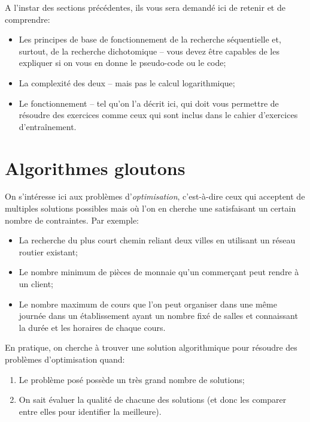 \documentclass[12pt]{article}
\begin{document}
	\begin{MonRet}
		A l'instar des sections précédentes, ils vous sera demandé ici de retenir et de comprendre:
		\begin{itemize}
			\item Les principes de base de fonctionnement de la recherche séquentielle et, surtout, de la recherche dichotomique -- vous devez être capables de les expliquer si on vous en donne le pseudo-code ou le code;
			\item La complexité des deux -- mais pas le calcul logarithmique;
			\item Le fonctionnement -- tel qu'on l'a décrit ici, qui doit vous permettre de résoudre des exercices comme ceux qui sont inclus dans le cahier d'exercices d'entraînement.
		\end{itemize}
		
		
	\end{MonRet}
	\pagebreak
	
	\section{Algorithmes gloutons}
	On s'intéresse ici aux problèmes d'\textit{optimisation}, c'est-à-dire ceux qui acceptent de multiples solutions possibles mais où l'on en cherche une satisfaisant un certain nombre de contraintes. Par exemple:
	\begin{itemize}
		\item La recherche du plus court chemin reliant deux villes en utilisant un réseau routier existant;
		\item Le nombre minimum de pièces de monnaie qu'un commerçant peut rendre à un client;
		\item Le nombre maximum de cours que l'on peut organiser dans une même journée dans un  établissement ayant un nombre fixé de salles et connaissant la durée et les horaires de chaque cours.
	\end{itemize}
	
	En pratique, on cherche à trouver une solution algorithmique pour résoudre des problèmes d'optimisation quand:
	\begin{enumerate}
		\item Le problème posé possède un très grand nombre de solutions;
		\item On sait évaluer la qualité de chacune des solutions (et donc les comparer entre elles pour identifier la meilleure).
	\end{enumerate}
	
\end{document}
